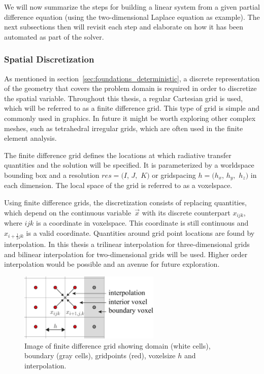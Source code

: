 We will now summarize the steps for building a linear system from a given partial difference equation (using the two-dimensional Laplace equation as example). The next subsections then will revisit each step and elaborate on how it has been automated as part of the solver.

\subsubsection*{Spatial Discretization}

As mentioned in section~\ref{sec:foundations_deterministic}, a discrete representation of the geometry that covers the problem domain is required in order to discretize the spatial variable. Throughout this thesis, a regular Cartesian grid is used, which will be referred to as a finite difference grid. This type of grid is simple and commonly used in graphics. In future it might be worth exploring other complex meshes, such as tetrahedral irregular grids, which are often used in the finite element analysis. 

The finite difference grid defines the locations at which radiative transfer quantities and the solution will be specified. It is parameterized by a worldspace bounding box and a resolution $res=(I$, $J,$ $K)$ or gridspacing $h=(h_x$, $h_y,$ $h_z)$ in each dimension. The local space of the grid is referred to as a voxelspace.

Using finite difference grids, the discretization consists of replacing quantities, which depend on the continuous variable~$\vec{x}$ with its discrete counterpart $x_{ijk}$, where $ijk$ is a coordinate in voxelspace. This coordinate is still continuous and $x_{i+\frac{1}{2}jk}$ is a valid coordinate. Quantities around grid point locations are found by interpolation. In this thesis a trilinear interpolation for three-dimensional grids and bilinear interpolation for two-dimensional grids will be used. Higher order interpolation would be possible and an avenue for future exploration.
\begin{figure}[h]
\centering
\includegraphics[width=0.6\textwidth]{04_pn_method/figures/fig_fd_grids.pdf}
\caption{Image of finite difference grid showing domain (white cells), boundary (gray cells), gridpoints (red), voxelsize $h$ and interpolation.}
\label{fig:pn_solver_finite_difference_grid}
\end{figure}

